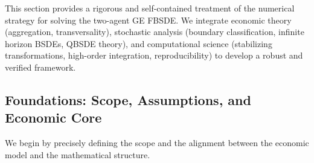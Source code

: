 This section provides a rigorous and self-contained treatment of the numerical strategy for solving the two-agent GE FBSDE. We integrate economic theory (aggregation, transversality), stochastic analysis (boundary classification, infinite horizon BSDEs, QBSDE theory), and computational science (stabilizing transformations, high-order integration, reproducibility) to develop a robust and verified framework.

\subsection{Foundations: Scope, Assumptions, and Economic Core}
\label{subsec:GE_foundations}

We begin by precisely defining the scope and the alignment between the economic model and the mathematical structure.

